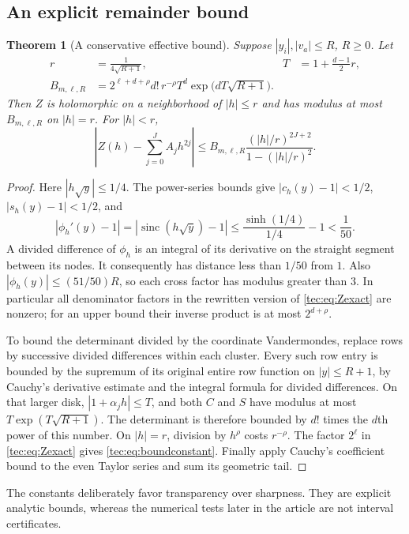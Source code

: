 \documentclass[11pt,a4paper]{article}
\numberwithin{equation}{section}
\newtheorem{theorem}{Theorem}[section]
\theoremstyle{definition}
\theoremstyle{remark}
\newcommand{\sinc}{\operatorname{sinc}}
\begin{document}
\subsection{An explicit remainder bound}
\begin{theorem}[A conservative effective bound]\label{tec:thm:bound}
Suppose $|y_i|,|v_a|\le R$, $R\ge0$. Let
\begin{align}
 r&=\frac1{4\sqrt{R+1}},&T&=1+\frac{d-1}{2}r,\\
 B_{m,\ell,R}&=2^{\ell+d+\rho}d!\,r^{-\rho}T^d
                  \exp\bigl(dT\sqrt{R+1}\bigr).
                  \label{tec:eq:boundconstant}
\end{align}
Then $Z$ is holomorphic on a neighborhood of $|h|\le r$ and has modulus
at most $B_{m,\ell,R}$ on $|h|=r$. For $|h|<r$,
\begin{equation}\label{tec:eq:bound}
 \left|Z(h)-\sum_{j=0}^J A_jh^{2j}\right|
 \le B_{m,\ell,R}
       \frac{(|h|/r)^{2J+2}}{1-(|h|/r)^2}.
\end{equation}
\end{theorem}
\begin{proof}
Here $|h\sqrt y|\le1/4$. The power-series bounds give
$|c_h(y)-1|<1/2$, $|s_h(y)-1|<1/2$, and
\[
 |\phi_h'(y)-1|=|\sinc(h\sqrt y)-1|
 \le\frac{\sinh(1/4)}{1/4}-1<\frac1{50}.
\]
A divided difference of $\phi_h$ is an integral of its derivative on
the straight segment between its nodes. It consequently has distance
less than $1/50$ from $1$. Also $|\phi_h(y)|\le(51/50)R$, so each cross
factor has modulus greater than $3$. In particular all denominator
factors in the rewritten version of \eqref{tec:eq:Zexact} are nonzero;
for an upper bound their inverse product is at most $2^{d+\rho}$.

To bound the determinant divided by the coordinate Vandermondes, replace
rows by successive divided differences within each cluster. Every such
row entry is bounded by the supremum of its original entire row function
on $|y|\le R+1$, by Cauchy's derivative estimate and the integral formula
for divided differences. On that larger disk, $|1+\alpha_jh|\le T$,
and both $C$ and $S$ have modulus at most
$T\exp(T\sqrt{R+1})$. The determinant is therefore bounded by $d!$
times the $d$th power of this number. On $|h|=r$, division by $h^\rho$
costs $r^{-\rho}$. The factor $2^\ell$ in \eqref{tec:eq:Zexact} gives
\eqref{tec:eq:boundconstant}. Finally apply Cauchy's coefficient bound to
the even Taylor series and sum its geometric tail.
\end{proof}
The constants deliberately favor transparency over sharpness. They are
explicit analytic bounds, whereas the numerical tests later in the
article are not interval certificates.
\end{document}
